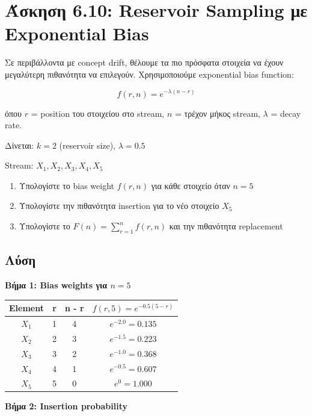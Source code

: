 \section{Άσκηση 6.10: Reservoir Sampling με Exponential Bias}

\begin{formulabox}[Εκφώνηση]
Σε περιβάλλοντα με concept drift, θέλουμε τα πιο πρόσφατα στοιχεία να έχουν
μεγαλύτερη πιθανότητα να επιλεγούν. Χρησιμοποιούμε exponential bias function:

$$f(r, n) = e^{-\lambda(n - r)}$$

όπου $r$ = position του στοιχείου στο stream, $n$ = τρέχον μήκος stream,
$\lambda$ = decay rate.

Δίνεται: $k = 2$ (reservoir size), $\lambda = 0.5$

Stream: $X_1, X_2, X_3, X_4, X_5$

\begin{enumerate}
    \item Υπολογίστε το bias weight $f(r, n)$ για κάθε στοιχείο όταν $n = 5$
    \item Υπολογίστε την πιθανότητα insertion για το νέο στοιχείο $X_5$
    \item Υπολογίστε το $F(n) = \sum_{r=1}^{n} f(r, n)$ και την πιθανότητα replacement
\end{enumerate}
\end{formulabox}

\subsection*{Λύση}

\textbf{Βήμα 1: Bias weights για $n = 5$}

\begin{center}
\begin{tabular}{cccc}
\toprule
\textbf{Element} & \textbf{r} & \textbf{n - r} & \textbf{$f(r,5) = e^{-0.5(5-r)}$} \\
\midrule
$X_1$ & 1 & 4 & $e^{-2.0} = 0.135$ \\
$X_2$ & 2 & 3 & $e^{-1.5} = 0.223$ \\
$X_3$ & 3 & 2 & $e^{-1.0} = 0.368$ \\
$X_4$ & 4 & 1 & $e^{-0.5} = 0.607$ \\
$X_5$ & 5 & 0 & $e^{0} = 1.000$ \\
\bottomrule
\end{tabular}
\end{center}

\textbf{Βήμα 2: Insertion probability}

